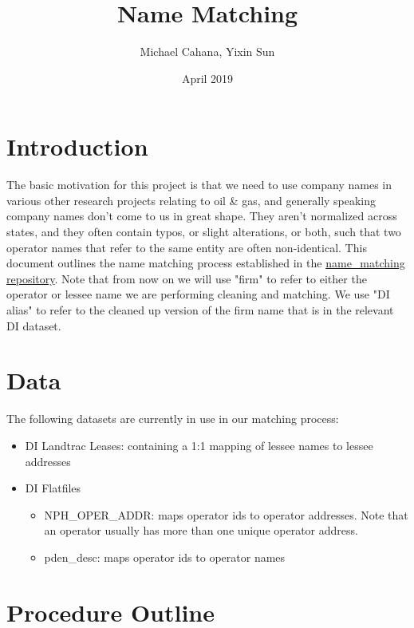 \documentclass{article}
\title{Name Matching}
\author{Michael Cahana, Yixin Sun}
\date{April 2019}
\begin{document}
\maketitle

\tableofcontents

\section{Introduction}
The basic motivation for this project is that we need to use company names in various other research projects relating to oil & gas, and generally speaking company names don't come to us in great shape. They aren't normalized across states, and they often contain typos, or slight alterations, or both, such that two operator names that refer to the same entity are often non-identical. 
This document outlines the name matching process established in the \href{https://github.com/m-cahana/name_matching}{name\_matching repository}. Note that from now on we will use "firm" to refer to either the operator or lessee name we are performing cleaning and matching. We use "DI alias" to refer to the cleaned up version of the firm name that is in the relevant DI dataset. 

\section{Data}
The following datasets are currently in use in our matching process:
\begin{itemize}
    \item DI Landtrac Leases: containing a 1:1 mapping of lessee names to lessee addresses
    \item DI Flatfiles 
    \begin{itemize}
        \item NPH\_OPER\_ADDR: maps operator ids to operator addresses. Note that an operator usually has more than one unique operator address. 
        \item pden\_desc: maps operator ids to operator names
    \end{itemize}
\end{itemize}

\section{Procedure Outline}
\end{document}
